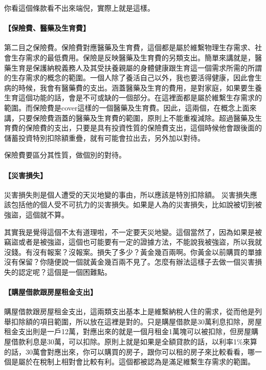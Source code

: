 \documentclass[oneside,sub3section]{ctexbook}
\let\oldparagraph\paragraph
\renewcommand{\paragraph}[1]{\oldparagraph{#1}\mbox{}}
\begin{document}
你看這個條款看不出來端倪，實際上就是這樣。

\hypertarget{ux4fddux96aaux8cbbux91abux85e5ux53caux751fux80b2ux8cbb}{%
\paragraph{【保險費、醫藥及生育費】}\label{ux4fddux96aaux8cbbux91abux85e5ux53caux751fux80b2ux8cbb}}

第二目之保險費。保險費對應醫藥及生育費，這個都是屬於維繫物理生存需求、社會生存需求的最低費用。保險是反映醫藥及生育費的另類支出。簡單來講就是，醫藥生育是保護納稅義務人及其受扶養親屬的身體健康跟生育這一個需求所需的所謂的生存需求的概念的範圍。一個人除了養活自己以外，我也要活得健康，因此會生病的時候，我會有醫藥費的支出。涵蓋醫藥及生育的費用，是對家庭，如果要生養生育這個功能的話，會是不可或缺的一個部分。在這裡面都是屬於維繫生存需求的範圍。而保險費是cover這樣的一個醫藥及生育費。因此，這兩個，在概念上面來講，只要保險費涵蓋的醫藥及生育費的範圍，原則上不能重複減除。超過醫藥及生育費的保險費的支出，只要是具有投資性質的保險費支出，這個時候他會跟後面的儲蓄投資特別扣除額重疊，就有可能會拉出去，另外加以對待。

保險費要區分其性質，做個別的對待。

\hypertarget{ux707dux5bb3ux640dux5931}{%
\paragraph{【災害損失】}\label{ux707dux5bb3ux640dux5931}}

災害損失則是個人遭受的天災地變的事由，所以應該是特別扣除額。
災害損失應該包括他的個人受不可抗力的災害損失。如果是人為的災害損失，比如說被切到被強盜，這個就不算。

其實我是覺得這個不太有道理啦，不一定要天災地變。這個當然了，因為如果是被竊盜或者是被強盜，這個也可能要有一定的證據方法，不能說我被強盜，所以我就沒錢。有沒有報案？沒報案。損失了多少？黃金幾百兩啊。你黃金以前購買的單據沒有保留？你隨便說一個就黃金幾百兩不見了。怎麼有辦法這樣子去做一個災害損失的認定呢？這個是一個困難點。

\hypertarget{ux8cfcux5c4bux501fux6b3eux8ddfux623fux5c4bux79dfux91d1ux652fux51fa}{%
\paragraph{【購屋借款跟房屋租金支出】}\label{ux8cfcux5c4bux501fux6b3eux8ddfux623fux5c4bux79dfux91d1ux652fux51fa}}

購屋借款跟房屋租金支出，這兩類支出基本上是維繫納稅人住的需求，從而他是列舉扣除額的項目範圍，所以放在這裡是對的。只是購屋借款是30萬利息扣除，房屋租金支出則是一戶12萬，對應出來的就是一個月租金1萬塊可以被扣除，但房屋購屋借款利息是30萬，可以扣除。原則上就是如果是全額貸款的話，以利率1\%來算的話，30萬會對應出來，你可以購買的房子，跟你可以租的房子來比較看看，哪一個是屬於在稅制上相對會比較有利。這個都被認為是滿足維繫生存需求的範圍。
\end{document}
